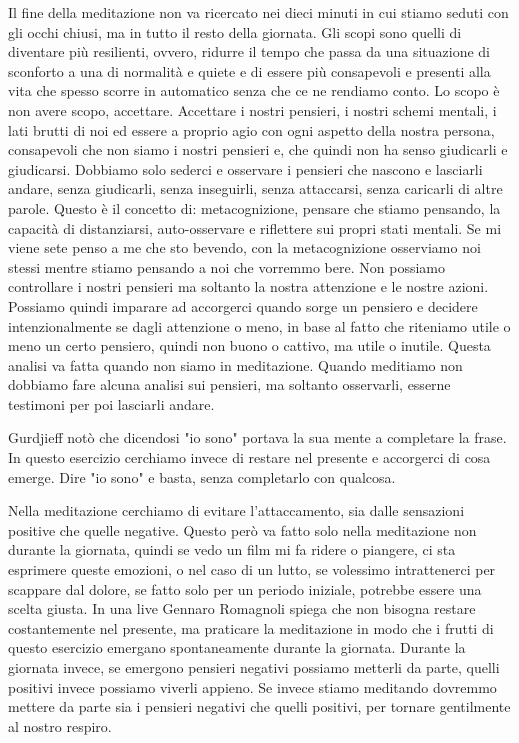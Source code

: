 \documentclass[12pt]{book} %
\begin{document}
Il fine della meditazione non va ricercato nei dieci minuti in cui stiamo seduti con gli occhi chiusi, ma in tutto il
resto della giornata. Gli scopi sono quelli di diventare più
resilienti, ovvero, ridurre il tempo che passa da una situazione di sconforto a una di normalità e quiete e di essere più consapevoli e presenti alla vita che spesso scorre in automatico senza che ce ne rendiamo conto. Lo scopo è non avere scopo, accettare. Accettare i nostri pensieri, i nostri
schemi mentali, i lati brutti di noi ed essere a proprio agio con ogni aspetto della nostra persona, consapevoli che
non siamo i nostri pensieri e, che quindi non ha senso giudicarli e giudicarsi.
Dobbiamo solo sederci e osservare i pensieri che nascono e lasciarli andare, senza giudicarli, senza inseguirli, senza attaccarsi, senza caricarli di altre parole.
Questo è il concetto di: metacognizione, pensare che stiamo pensando, la capacità di distanziarsi, auto-osservare e riflettere sui propri
stati mentali. Se mi viene sete penso a me che sto bevendo, con la metacognizione osserviamo
noi stessi mentre stiamo pensando a noi che vorremmo bere. Non possiamo controllare i nostri pensieri ma soltanto la
nostra attenzione e le nostre azioni. Possiamo quindi imparare ad accorgerci quando sorge un pensiero e decidere
intenzionalmente se dagli attenzione o meno, in base al fatto che riteniamo utile o meno un certo pensiero, quindi non
buono o cattivo, ma utile o inutile. Questa analisi va fatta quando non siamo in meditazione. Quando meditiamo non
dobbiamo fare alcuna analisi sui pensieri, ma soltanto osservarli, esserne testimoni per poi lasciarli andare.

Gurdjieff notò che dicendosi "io sono" portava la sua mente a completare la frase. In questo esercizio cerchiamo invece di restare nel presente e accorgerci di cosa emerge. Dire "io sono" e basta, senza completarlo con qualcosa.

Nella meditazione cerchiamo di evitare l'attaccamento, sia dalle sensazioni positive che quelle negative. Questo però va fatto solo nella meditazione non durante la giornata, quindi se vedo un film mi fa ridere o piangere, ci sta esprimere queste emozioni, o nel caso di un lutto, se volessimo intrattenerci per scappare dal dolore, se fatto solo per un periodo iniziale, potrebbe essere una scelta giusta.
In una live Gennaro Romagnoli spiega che non bisogna restare costantemente nel presente, ma praticare la meditazione in modo che i frutti di questo esercizio emergano spontaneamente durante la giornata. Durante la giornata invece, se emergono pensieri negativi possiamo metterli da parte, quelli positivi invece possiamo viverli appieno. Se invece stiamo meditando dovremmo mettere da parte sia i pensieri negativi che quelli positivi, per tornare gentilmente al nostro respiro.
\end{document}
